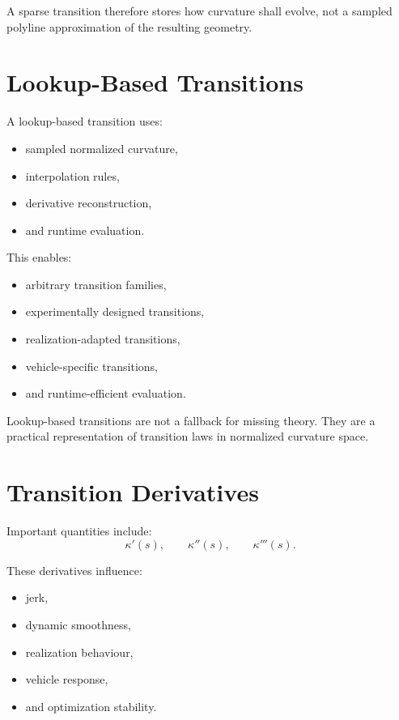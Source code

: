 A sparse transition therefore stores how curvature shall evolve, not a
sampled polyline approximation of the resulting geometry.

\section{Lookup-Based Transitions}

\begin{definition}
\label{def:lookup-based-transition}
A lookup-based transition uses:
\begin{itemize}
\item sampled normalized curvature,
\item interpolation rules,
\item derivative reconstruction,
\item and runtime evaluation.
\end{itemize}
\end{definition}

This enables:
\begin{itemize}
\item arbitrary transition families,
\item experimentally designed transitions,
\item realization-adapted transitions,
\item vehicle-specific transitions,
\item and runtime-efficient evaluation.
\end{itemize}

Lookup-based transitions are not a fallback for missing theory. They are
a practical representation of transition laws in normalized curvature
space.

\section{Transition Derivatives}

\begin{definition}
\label{def:transition-derivatives}
Important quantities include:
\[
\kappa'(s),
\qquad
\kappa''(s),
\qquad
\kappa'''(s).
\]
\end{definition}

These derivatives influence:
\begin{itemize}
\item jerk,
\item dynamic smoothness,
\item realization behaviour,
\item vehicle response,
\item and optimization stability.
\end{itemize}

